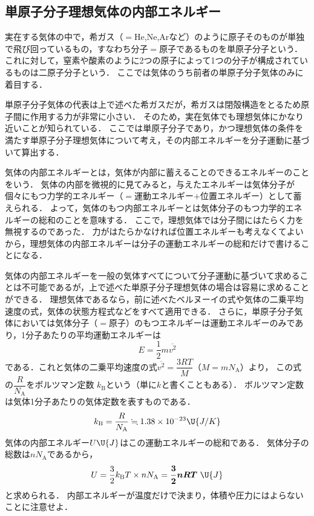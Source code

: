 \subsection{単原子分子理想気体の内部エネルギー}

実在する気体の中で，希ガス（$=$He,\hspace{1mm}Ne,\hspace{1mm}Arなど）のように原子そのものが単独で飛び回っているもの，すなわち分子$=$原子であるものを{\gtfamily 単原子分子}という．
これに対して，窒素や酸素のように2つの原子によって1つの分子が構成されているものは{\gtfamily 二原子分子}という．
ここでは気体のうち前者の単原子分子気体のみに着目する．

単原子分子気体の代表は上で述べた希ガスだが，希ガスは閉殻構造をとるため原子間に作用する力が非常に小さい．
そのため，実在気体でも理想気体にかなり近いことが知られている．
ここでは単原子分子であり，かつ理想気体の条件を満たす単原子分子理想気体について考え，その内部エネルギーを分子運動に基づいて算出する．

気体の内部エネルギーとは，気体が内部に蓄えることのできるエネルギーのことをいう．
気体の内部を微視的に見てみると，与えたエネルギーは気体分子が個々にもつ力学的エネルギー（$=$運動エネルギー$+$位置エネルギー）として蓄えられる．
よって，{\gtfamily 気体のもつ内部エネルギーとは気体分子のもつ力学的エネルギーの総和のことを意味する．}
ここで，{\gtfamily 理想気体では分子間にはたらく力を無視する}のであった．
力がはたらかなければ位置エネルギーも考えなくてよいから，{\gtfamily 理想気体の内部エネルギーは分子の運動エネルギーの総和だけで書ける}ことになる．

気体の内部エネルギーを一般の気体すべてについて分子運動に基づいて求めることは不可能であるが，上で述べた単原子分子理想気体の場合は容易に求めることができる．
理想気体であるなら，前に述べたベルヌーイの式や気体の二乗平均速度の式，気体の状態方程式などをすべて適用できる．
さらに，単原子分子気体においては気体分子（$=$原子）のもつエネルギーは運動エネルギーのみであり，1分子あたりの平均運動エネルギーは
\[E=\frac{1}{2}m\overline{v^2}\]
である．これと気体の二乗平均速度の式$\overline{v^2}=\dfrac{3RT}{M}$（$M=mN_{\mathrm{A}}$）より，
この式の$\dfrac{R}{N_{\mathrm{A}}}$を{\gtfamily ボルツマン定数} \mbox{\boldmath $k_{\mathrm{B}}$}という（単に$k$と書くこともある）．
ボルツマン定数は気体1分子あたりの気体定数を表すものである．
\[k_{\mathrm{B}}=\frac{R}{N_{\mathrm{A}}} \fallingdotseq 1.38\times10^{-23}\U{J/K}\]
気体の内部エネルギー$U\U{J}$はこの運動エネルギーの総和である．
気体分子の総数は$nN_{\mathrm{A}}$であるから，
\[ U=\frac{3}{2}k_{\mathrm{B}}T\times nN_{\mathrm{A}} =\mbox{\boldmath $\dfrac{3}{2}nRT$}\ \U{J}\]
と求められる．
{\gtfamily 内部エネルギーが温度だけで決まり，体積や圧力にはよらない}ことに注意せよ．


